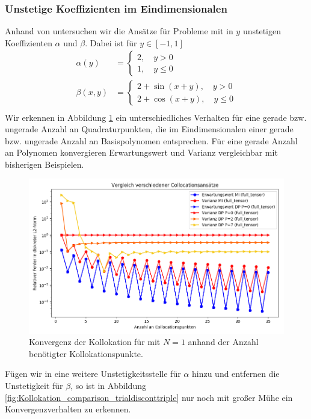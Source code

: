 \subsubsection*{Unstetige Koeffizienten im Eindimensionalen}
Anhand von  untersuchen wir die Ansätze für Probleme mit in $y$ unstetigen Koeffizienten $\alpha$ und $\beta$. Dabei ist für $y\in[-1,1]$
\begin{align*}
\alpha(y)&=\begin{cases}2,\quad y>0\\ 1, \quad y\le 0\end{cases}\\
\beta(x,y)&=\begin{cases}2+\sin(x+y),\quad y>0\\ 2+\cos(x+y),\quad y\le 0\end{cases}\\
\end{align*}
Wir erkennen in Abbildung \ref{fig:Kollokation_comparison_trialdiscontsimple} ein unterschiedliches Verhalten für eine gerade bzw. ungerade Anzahl an Quadraturpunkten, die im Eindimensionalen einer gerade bzw. ungerade Anzahl an Basispolynomen entsprechen. Für eine gerade Anzahl an Polynomen konvergieren Erwartungswert und Varianz vergleichbar mit bisherigen Beispielen.
\begin{figure}[!htb]
\includegraphics[width=\textwidth]{Figures/collocation_midp_trialdiscontsimple.png}
\caption{Konvergenz der Kollokation für  mit $N=1$ anhand der Anzahl benötigter Kollokationspunkte.}
\label{fig:Kollokation_comparison_trialdiscontsimple}
\end{figure}
Fügen wir in  eine weitere Unstetigkeitsstelle für $\alpha$ hinzu und entfernen die Unstetigkeit für $\beta$, so ist in Abbildung \ref{fig:Kollokation_comparison_trialdisconttriple} nur noch mit großer Mühe ein Konvergenzverhalten zu erkennen.
